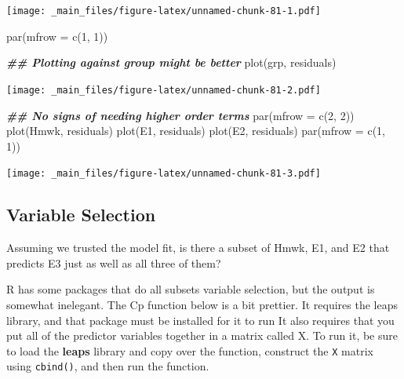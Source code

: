 \documentclass[
]{book}
\newenvironment{Shaded}{\begin{snugshade}}{\end{snugshade}}
\newcommand{\AttributeTok}[1]{\textcolor[rgb]{0.77,0.63,0.00}{#1}}
\newcommand{\DecValTok}[1]{\textcolor[rgb]{0.00,0.00,0.81}{#1}}
\newcommand{\DocumentationTok}[1]{\textcolor[rgb]{0.56,0.35,0.01}{\textbf{\textit{#1}}}}
\newcommand{\FunctionTok}[1]{\textcolor[rgb]{0.00,0.00,0.00}{#1}}
\newcommand{\NormalTok}[1]{#1}
\begin{document}
\texttt{[image: \_main\_files/figure-latex/unnamed-chunk-81-1.pdf]}

\begin{Shaded}
\begin{Highlighting}[]
\FunctionTok{par}\NormalTok{(}\AttributeTok{mfrow =} \FunctionTok{c}\NormalTok{(}\DecValTok{1}\NormalTok{, }\DecValTok{1}\NormalTok{))}

\DocumentationTok{\#\# Plotting against group might be better}
\FunctionTok{plot}\NormalTok{(grp, residuals)}
\end{Highlighting}
\end{Shaded}

\texttt{[image: \_main\_files/figure-latex/unnamed-chunk-81-2.pdf]}

\begin{Shaded}
\begin{Highlighting}[]
\DocumentationTok{\#\# No signs of needing higher order terms}
\FunctionTok{par}\NormalTok{(}\AttributeTok{mfrow =} \FunctionTok{c}\NormalTok{(}\DecValTok{2}\NormalTok{, }\DecValTok{2}\NormalTok{))}
\FunctionTok{plot}\NormalTok{(Hmwk, residuals)}
\FunctionTok{plot}\NormalTok{(E1, residuals)}
\FunctionTok{plot}\NormalTok{(E2, residuals)}
\FunctionTok{par}\NormalTok{(}\AttributeTok{mfrow =} \FunctionTok{c}\NormalTok{(}\DecValTok{1}\NormalTok{, }\DecValTok{1}\NormalTok{))}
\end{Highlighting}
\end{Shaded}

\texttt{[image: \_main\_files/figure-latex/unnamed-chunk-81-3.pdf]}

\hypertarget{variable-selection}{%
\subsection{Variable Selection}\label{variable-selection}}

Assuming we trusted the model fit, is there a subset of Hmwk, E1, and E2 that predicts E3 just as well as all three of them?

R has some packages that do all subsets variable selection, but the output is somewhat inelegant. The Cp function below is a bit prettier. It requires the leaps library, and that package must be installed for it to run It also requires that you put all of the predictor variables together in a matrix called X. To run it, be sure to load the \textbf{leaps} library and copy over the function, construct the \texttt{X} matrix using \texttt{cbind()}, and then run the function.
\end{document}
